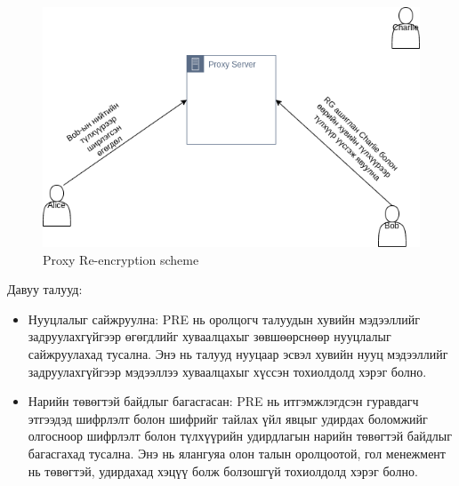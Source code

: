 \begin{figure}[ht]
\centering
\includegraphics[scale=0.5]{Figures/pre}
\caption[Proxy Re-encryption scheme]{Proxy Re-encryption scheme}
\label{fig:PRE_Scheme}
\end{figure}

Давуу талууд:
\begin{itemize}
    \item Нууцлалыг сайжруулна: PRE нь оролцогч талуудын хувийн мэдээллийг задруулахгүйгээр өгөгдлийг хуваалцахыг зөвшөөрснөөр нууцлалыг сайжруулахад тусална. Энэ нь талууд нууцаар эсвэл хувийн нууц мэдээллийг задруулахгүйгээр мэдээллээ хуваалцахыг хүссэн тохиолдолд хэрэг болно.
    \item Нарийн төвөгтэй байдлыг багасгасан: PRE нь итгэмжлэгдсэн гуравдагч этгээдэд шифрлэлт болон шифрийг тайлах үйл явцыг удирдах боломжийг олгосноор шифрлэлт болон түлхүүрийн удирдлагын нарийн төвөгтэй байдлыг багасгахад тусална. Энэ нь ялангуяа олон талын оролцоотой, гол менежмент нь төвөгтэй, удирдахад хэцүү болж болзошгүй тохиолдолд хэрэг болно.
\end{itemize}

